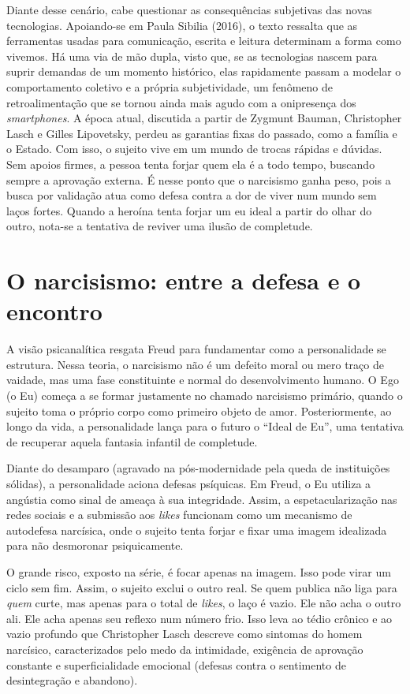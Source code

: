 \documentclass[12pt, a4paper, oneside]{abntex2}
\begin{document}
Diante desse cenário, cabe questionar as consequências subjetivas das novas tecnologias. Apoiando-se em Paula Sibilia (2016), o texto ressalta que as ferramentas usadas para comunicação, escrita e leitura determinam a forma como vivemos. Há uma via de mão dupla, visto que, se as tecnologias nascem para suprir demandas de um momento histórico, elas rapidamente passam a modelar o comportamento coletivo e a própria subjetividade, um fenômeno de retroalimentação que se tornou ainda mais agudo com a onipresença dos \textit{smartphones}.
A época atual, discutida a partir de Zygmunt Bauman, Christopher Lasch e Gilles Lipovetsky, perdeu as garantias fixas do passado, como a família e o Estado. Com isso, o sujeito vive em um mundo de trocas rápidas e dúvidas. Sem apoios firmes, a pessoa tenta forjar quem ela é a todo tempo, buscando sempre a aprovação externa. É nesse ponto que o narcisismo ganha peso, pois a busca por validação atua como defesa contra a dor de viver num mundo sem laços fortes. Quando a heroína tenta forjar um eu ideal a partir do olhar do outro, nota-se a tentativa de reviver uma ilusão de completude.
\chapter{O narcisismo: entre a defesa e o encontro}
A visão psicanalítica resgata Freud para fundamentar como a personalidade se estrutura. Nessa teoria, o narcisismo não é um defeito moral ou mero traço de vaidade, mas uma fase constituinte e normal do desenvolvimento humano. O Ego (o Eu) começa a se formar justamente no chamado narcisismo primário, quando o sujeito toma o próprio corpo como primeiro objeto de amor. Posteriormente, ao longo da vida, a personalidade lança para o futuro o ``Ideal de Eu'', uma tentativa de recuperar aquela fantasia infantil de completude.

Diante do desamparo (agravado na pós-modernidade pela queda de instituições sólidas), a personalidade aciona defesas psíquicas. Em Freud, o Eu utiliza a angústia como sinal de ameaça à sua integridade. Assim, a espetacularização nas redes sociais e a submissão aos \textit{likes} funcionam como um mecanismo de autodefesa narcísica, onde o sujeito tenta forjar e fixar uma imagem idealizada para não desmoronar psiquicamente.

O grande risco, exposto na série, é focar apenas na imagem. Isso pode virar um ciclo sem fim. Assim, o sujeito exclui o outro real. Se quem publica não liga para \textit{quem} curte, mas apenas para o total de \textit{likes}, o laço é vazio. Ele não acha o outro ali. Ele acha apenas seu reflexo num número frio. Isso leva ao tédio crônico e ao vazio profundo que Christopher Lasch descreve como sintomas do homem narcísico, caracterizados pelo medo da intimidade, exigência de aprovação constante e superficialidade emocional (defesas contra o sentimento de desintegração e abandono).
\end{document}
